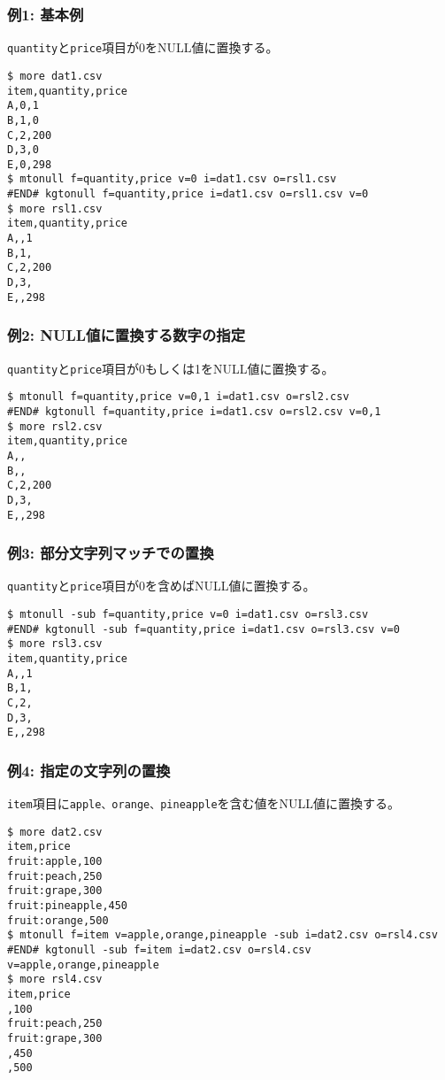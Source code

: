 \subsubsection*{例1: 基本例}

\verb|quantity|と\verb|price|項目が0をNULL値に置換する。


\begin{Verbatim}[baselinestretch=0.7,frame=single]
$ more dat1.csv
item,quantity,price
A,0,1
B,1,0
C,2,200
D,3,0
E,0,298
$ mtonull f=quantity,price v=0 i=dat1.csv o=rsl1.csv
#END# kgtonull f=quantity,price i=dat1.csv o=rsl1.csv v=0
$ more rsl1.csv
item,quantity,price
A,,1
B,1,
C,2,200
D,3,
E,,298
\end{Verbatim}
\subsubsection*{例2: NULL値に置換する数字の指定}

\verb|quantity|と\verb|price|項目が0もしくは1をNULL値に置換する。


\begin{Verbatim}[baselinestretch=0.7,frame=single]
$ mtonull f=quantity,price v=0,1 i=dat1.csv o=rsl2.csv
#END# kgtonull f=quantity,price i=dat1.csv o=rsl2.csv v=0,1
$ more rsl2.csv
item,quantity,price
A,,
B,,
C,2,200
D,3,
E,,298
\end{Verbatim}
\subsubsection*{例3: 部分文字列マッチでの置換}

\verb|quantity|と\verb|price|項目が0を含めばNULL値に置換する。


\begin{Verbatim}[baselinestretch=0.7,frame=single]
$ mtonull -sub f=quantity,price v=0 i=dat1.csv o=rsl3.csv
#END# kgtonull -sub f=quantity,price i=dat1.csv o=rsl3.csv v=0
$ more rsl3.csv
item,quantity,price
A,,1
B,1,
C,2,
D,3,
E,,298
\end{Verbatim}
\subsubsection*{例4: 指定の文字列の置換}

\verb|item|項目に\verb|apple、orange、pineapple|を含む値をNULL値に置換する。


\begin{Verbatim}[baselinestretch=0.7,frame=single]
$ more dat2.csv
item,price
fruit:apple,100
fruit:peach,250
fruit:grape,300
fruit:pineapple,450
fruit:orange,500
$ mtonull f=item v=apple,orange,pineapple -sub i=dat2.csv o=rsl4.csv
#END# kgtonull -sub f=item i=dat2.csv o=rsl4.csv v=apple,orange,pineapple
$ more rsl4.csv
item,price
,100
fruit:peach,250
fruit:grape,300
,450
,500
\end{Verbatim}
